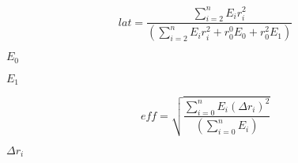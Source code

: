 \documentclass{article}
\begin{document}
\[ lat = \frac{\sum_{i=2}^{n} E_i r_i^2 }{ (\sum_{i=2}^{n} E_i r_i^2 + r_0^0 E_0 + r_0^2 E_1) } \]
\pagebreak

$ E_{0} $
\pagebreak

$ E_{1} $
\pagebreak

\[ eff = \sqrt{\frac{\sum_{i=0}^{n} E_i (\Delta r_i)^2 }{ (\sum_{i=0}^{n} E_i) }} \]
\pagebreak

$ \Delta r_i $
\pagebreak
\end{document}
